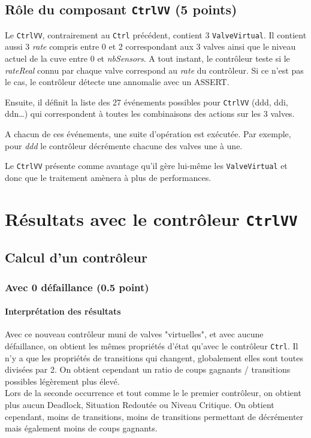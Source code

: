 \documentclass[a4paper]{book}
\begin{document}
\subsection{Rôle du composant {\tt CtrlVV} (5 points)}
Le {\tt CtrlVV}, contrairement au {\tt Ctrl} précédent, contient 3 {\tt ValveVirtual}. Il contient aussi 3 \textit{rate} 
compris entre 0 et 2 correspondant aux 3 valves ainsi que le niveau actuel de la cuve entre 0 et \textit{nbSensors}. A tout instant, 
le contrôleur teste si le \textit{rateReal} connu par chaque valve correspond au \textit{rate} du contrôleur. Si ce n'est pas le 
cas, le contrôleur détecte une annomalie avec un ASSERT.

Ensuite, il définit la liste des 27 événements possibles pour {\tt CtrlVV} (ddd, ddi, ddn\dots) qui correspondent à toutes les 
combinaisons des actions sur les 3 valves.

A chacun de ces événements, une suite d'opération est exécutée. Par exemple, pour \textit{ddd} le contrôleur décrémente chacune des 
valves une à une.

Le {\tt CtrlVV} présente comme avantage qu'il gère lui-même les {\tt ValveVirtual} et donc que le traitement amènera à plus de performances.

\section{Résultats avec le contrôleur {\tt CtrlVV}}
\subsection{Calcul d'un contrôleur}
\subsubsection{Avec 0 défaillance (0.5 point)}



%
%
\paragraph{Interprétation des résultats}
Avec ce nouveau contrôleur muni de valves "virtuelles", et avec aucune défaillance, on obtient les mêmes
propriétés d'état qu'avec le contrôleur {\tt Ctrl}. Il n'y a que les propriétés de transitions qui changent, 
globalement elles sont toutes divisées par 2. On obtient cependant un ratio de coups gagnants / transitions possibles légèrement plus élevé.  \\
Lors de la seconde occurrence et tout comme le le premier contrôleur, on obtient plus aucun Deadlock, Situation Redoutée ou Niveau Critique. 
On obtient cependant, moins de transitions, moins de transitions permettant de décrémenter mais également moins de coups gagnants.
\end{document}
